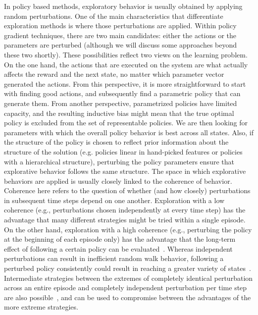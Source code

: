 \label{ssec:perturbed}
In policy based methods, exploratory behavior is usually obtained by applying random perturbations. One of the main characteristics that differentiate exploration methods is where those perturbations are applied. Within policy gradient techniques, there are two main candidates: either the actions or the parameters are perturbed (although we will discuss some approaches beyond these two shortly). These possibilities reflect two views on the learning problem. On the one hand, the actions that are executed on the system are what actually affects the reward and the next state, no matter which parameter vector generated the actions. From this perspective, it is more straightforward to start with finding good actions, and subsequently find a parametric policy that can generate them. From another perspective, parametrized policies have limited capacity, and the resulting inductive bias might mean that the true optimal policy is excluded from the set of representable policies. We are then looking for parameters with which the overall policy behavior is best across all states. Also, if the structure of the policy is chosen to  reflect prior information about the structure of the solution (e.g. policies linear in hand-picked features or policies with a hierarchical structure), perturbing the policy parameters ensure that explorative behavior follows the same structure. 
The space in which explorative behaviors are applied is usually closely linked to the coherence of behavior. Coherence here refers to the question of whether (and how closely) perturbations in subsequent time steps depend on one another. Exploration with a low coherence (e.g., perturbations chosen independently at every time step) has the advantage that many different strategies might be tried within a single episode. On the other hand, exploration with a high coherence (e.g., perturbing the policy at the beginning of each episode only) has the advantage that the long-term effect of following a certain policy can be evaluated~. Whereas independent perturbations can result in inefficient random walk behavior,  following a perturbed policy consistently could result in reaching a greater variety of states~. Intermediate strategies between the extremes of completely identical perturbation across an entire episode and completely independent perturbation per time step are also possible~, and can be used to compromise between the advantages of the more extreme strategies. 
